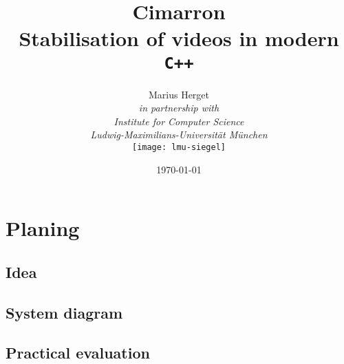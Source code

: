 \newcommand{\pdftitel}{Cimarron Herget 2017}
\newcommand{\autor}{Marius Herget}
\newcommand{\version}{draft} %
\newcommand{\isPrintVersion}{true}




\newcommand{\tbd}[1][null]{
    \ifthenelse{\equal{#1}{null}}
    {\ignorespaces\textit{\impmark\color{orange}\textbf{TBD}}}
    {\ignorespaces\textit{\impmark\color{orange}[TBD: #1]}}
}
\newcommand{\todo}[1][null]{
    \ifthenelse{\equal{#1}{null}}
    {\ignorespaces\textit{\impmark\color{orange}\textbf{TBD}}}
    {\ignorespaces\textit{\impmark\color{orange}[TBD: #1]}}
}



{}
\title{\textbf{Cimarron}\\Stabilisation of videos in modern \texttt{C++}}
\date{\today}
\author{    Marius Herget\\[2em]
            \textit{in partnership with}\\[2em]
            \textit{Institute for Computer Science}\\
            \textit{Ludwig-Maximilians-Universit\"at M\"unchen}\\[3em]
            \texttt{[image: lmu-siegel]}}
\maketitle
\tableofcontents
\newpage
{}

\chapter{Planing}
\section{Idea}
\section{System diagram}

\section{Practical evaluation}







